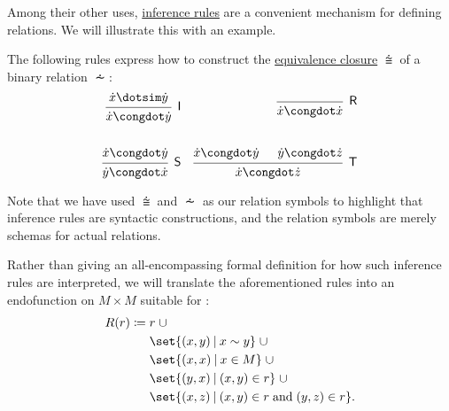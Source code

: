 \begin{example}\label{ex:fixed_point_recursion_for_relations}
  Among their other uses, \hyperref[def:inference_rule]{inference rules} are a convenient mechanism for defining relations. We will illustrate this with an example.

  The following rules express how to construct the \hyperref[thm:equivalence_closure]{equivalence closure} \( {\congdot} \) of a binary relation \( {\dotsim} \):
  \begin{align*}
    \begin{prooftree}
      \hypo{ \synx \dotsim \syny }
      \infer1[\logic{I}]{ \synx \congdot \syny }
    \end{prooftree}
    &&
    \begin{prooftree}
      \infer0[\logic{R}]{ \synx \congdot \synx }
    \end{prooftree}
    \\\\
    \begin{prooftree}
      \hypo{ \synx \congdot \syny }
      \infer1[\logic{S}]{ \syny \congdot \synx }
    \end{prooftree}
    &&
    \begin{prooftree}
      \hypo{ \synx \congdot \syny }
      \hypo{ \syny \congdot \synz }
      \infer2[\logic{T}]{ \synx \congdot \synz }
    \end{prooftree}
  \end{align*}

  Note that we have used \( {\congdot} \) and \( {\dotsim} \) as our relation symbols to highlight that inference rules are syntactic constructions, and the relation symbols are merely schemas for actual relations.

  Rather than giving an all-encompassing formal definition for how such inference rules are interpreted, we will translate the aforementioned rules into an endofunction on \( M \times M \) suitable for :
  \begin{equation*}
    \begin{aligned}
      R(r) \coloneqq \thickspace & r \thickspace {\cup} \\
                                 & \set{ (x, y) \given x \sim y } \thickspace {\cup} \\
                                 & \set{ (x, x) \given x \in M } \thickspace {\cup} \\
                                 & \set{ (y, x) \given (x, y) \in r } \thickspace {\cup} \\
                                 & \set{ (x, z) \given (x, y) \in r \T{and} (y, z) \in r }.
    \end{aligned}
  \end{equation*}


\end{example}
